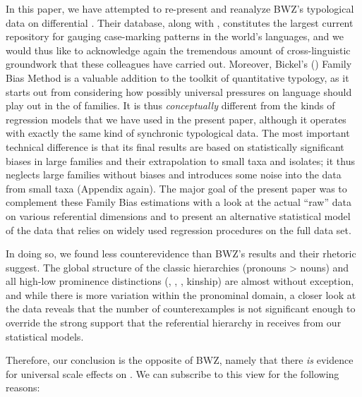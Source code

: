 \documentclass[output=paper]{langscibook}
\begin{document}
In this paper, we have attempted to re-present and reanalyze  BWZ's typological data on differential . Their database, along with , constitutes the largest current repository for gauging case-marking patterns in the world’s languages, and we would thus like to acknowledge again the tremendous amount of cross-linguistic groundwork that these colleagues have carried out. Moreover, Bickel's (\citeyear{Bickel2011Statistical,Bickel2013Distributional}) Family Bias Method is a valuable addition to the toolkit of quantitative typology, as it starts out from considering how possibly universal pressures on language should play out in the  of families. It is thus \textit{conceptually} different from the kinds of regression models that we have used in the present paper, although it operates with exactly the same kind of synchronic typological data. The most important technical difference is that its final results are based on statistically significant biases in large families and their extrapolation to small taxa and isolates; it thus neglects large families without biases and introduces some noise into the data from small taxa (\cf Appendix again). The major goal of the present paper was to complement these Family Bias estimations with a look at the actual “raw” data on various referential dimensions and to present an alternative statistical model of the data that relies on widely used regression procedures on the full data set.

In doing so, we found less counterevidence than BWZ’s results and their rhetoric suggest. The global structure of the classic hierarchies (pronouns > nouns) and all high-low prominence distinctions (, , , kinship) are almost without exception, and while there is more variation within the pronominal domain, a closer look at the data reveals that the number of counterexamples is not significant enough to override the strong support that the referential hierarchy in  receives from our statistical models.

Therefore, our conclusion is the opposite of BWZ, namely that there \textit{is} evidence for universal scale effects on . We can subscribe to this view for the following reasons:
\end{document}
